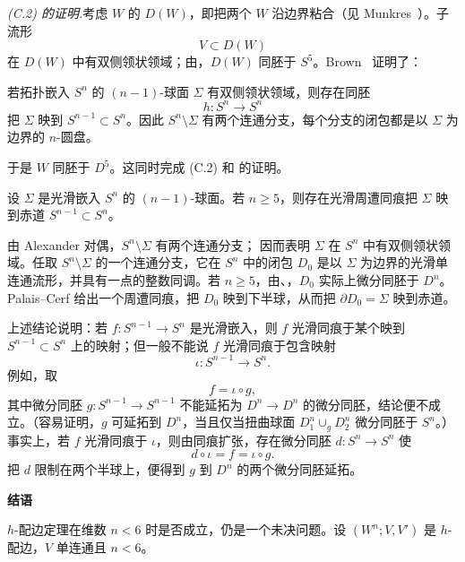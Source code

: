 \par\medskip\noindent\textit{(C.2) 的证明.}\quad 考虑 $W$ 的 $D(W)$，即把两个 $W$ 沿边界粘合（见 Munkres~\cite[p.~54]{ref05}）。子流形
\[
  V\subset D(W)
\]
在 $D(W)$ 中有双侧领状领域；由，$D(W)$ 同胚于 $S^5$。Brown~\cite{ref23} 证明了：

若拓扑嵌入 $S^n$ 的 $(n-1)$-球面 $\Sigma$ 有双侧领状领域，则存在同胚
\[
  h:S^n\longrightarrow S^n
\]
把 $\Sigma$ 映到 $S^{n-1}\subset S^n$。因此 $S^n\setminus\Sigma$ 有两个连通分支，每个分支的闭包都是以 $\Sigma$ 为边界的 $n$-圆盘。

于是 $W$ 同胚于 $D^5$。这同时完成 (C.2) 和 的证明。
\EndProof

设 $\Sigma$ 是光滑嵌入 $S^n$ 的 $(n-1)$-球面。若 $n\geq5$，则存在光滑周遭同痕把 $\Sigma$ 映到赤道 $S^{n-1}\subset S^n$。

\Proof 由 Alexander 对偶，$S^n\setminus\Sigma$ 有两个连通分支； 因而表明 $\Sigma$ 在 $S^n$ 中有双侧领状领域。任取 $S^n\setminus\Sigma$ 的一个连通分支，它在 $S^n$ 中的闭包 $D_0$ 是以 $\Sigma$ 为边界的光滑单连通流形，并具有一点的整数同调。若 $n\geq5$，由、，$D_0$ 实际上微分同胚于 $D^n$。Palais–Cerf  给出一个周遭同痕，把 $D_0$ 映到下半球，从而把 $\partial D_0=\Sigma$ 映到赤道。
\EndProof

\Remark 上述结论说明：若 $f:S^{n-1}\to S^n$ 是光滑嵌入，则 $f$ 光滑同痕于某个映到 $S^{n-1}\subset S^n$ 上的映射；但一般不能说 $f$ 光滑同痕于包含映射
\[
  \iota:S^{n-1}\longrightarrow S^n.
\]
例如，取
\[
  f=\iota\circ g,
\]
其中微分同胚 $g:S^{n-1}\to S^{n-1}$ 不能延拓为 $D^n\to D^n$ 的微分同胚，结论便不成立。（容易证明，$g$ 可延拓到 $D^n$，当且仅当扭曲球面 $D_1^n\cup_gD_2^n$ 微分同胚于 $S^n$。）事实上，若 $f$ 光滑同痕于 $\iota$，则由同痕扩张，存在微分同胚 $d:S^n\to S^n$ 使
\[
  d\circ\iota=f=\iota\circ g.
\]
把 $d$ 限制在两个半球上，便得到 $g$ 到 $D^n$ 的两个微分同胚延拓。

\par\bigskip\noindent\textbf{结语}\label{sec9:concluding-remarks}

$h$-配边定理在维数 $n<6$ 时是否成立，仍是一个未决问题。设 $(W^n;V,V')$ 是 $h$-配边，$V$ 单连通且 $n<6$。

